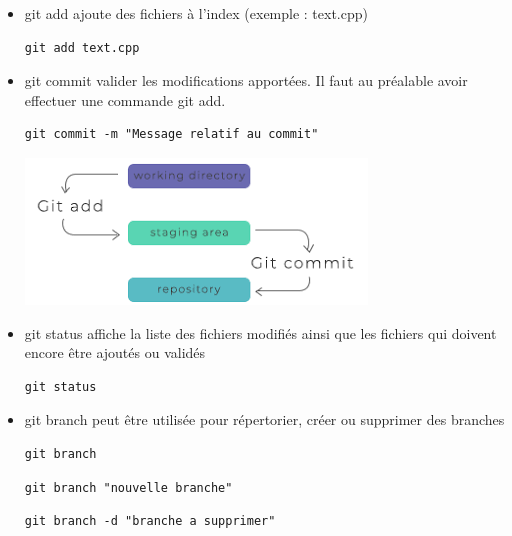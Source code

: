 \documentclass[french, 12pt]{article}%
\newcommand{\itemE}{\item[$\bullet$]}
\begin{document}
\begin{itemize}
\itemE git add ajoute des fichiers à l’index (exemple : text.cpp)

\begin{lstlisting}[style=commande]
git add text.cpp
\end{lstlisting}

\itemE git commit valider les modifications apportées. Il faut au préalable avoir effectuer une commande git add.	
\begin{lstlisting}[style=commande]
git commit -m "Message relatif au commit"
\end{lstlisting}

\begin{center}
\includegraphics[scale=0.7]{./ressource/gitAddCommit}
\end{center}


\itemE  git status affiche la liste des fichiers modifiés ainsi que les fichiers qui doivent encore être ajoutés ou validés 	

\begin{lstlisting}[style=commande]
git status
\end{lstlisting}


\itemE   git branch peut être utilisée pour répertorier, créer ou supprimer des branches 	
\begin{lstlisting}[style=commande]
git branch 
\end{lstlisting}

\begin{lstlisting}[style=commande]
git branch "nouvelle branche"
\end{lstlisting}

\begin{lstlisting}[style=commande]
git branch -d "branche a supprimer"
\end{lstlisting}



\end{itemize}
\end{document}
